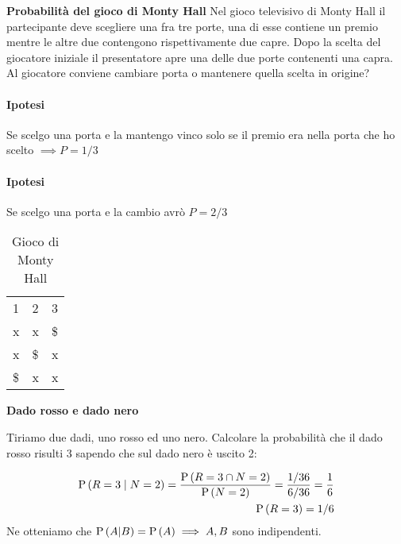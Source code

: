 \begin{exrc}
    \textbf{Probabilit\`a del gioco di Monty Hall}
    Nel gioco televisivo di Monty Hall il partecipante deve scegliere una fra tre porte, una di esse contiene un premio mentre le altre due contengono rispettivamente due capre. Dopo la scelta del giocatore iniziale il presentatore apre una delle due porte contenenti una capra. Al giocatore conviene cambiare porta o mantenere quella scelta in origine?
    
    \paragraph{Ipotesi} Se scelgo una porta e la mantengo vinco solo se il premio era nella porta che ho scelto $ \implies P = 1/3 $
    
    \paragraph{Ipotesi} Se scelgo una porta e la cambio avr\`o $ P = 2/3 $
    \begin{table}[H]
        \centering
        \caption{Gioco di Monty Hall}
        \begin{tabular}{lll}
            1  & 2  & 3  \\
            x  & x  & \$ \\
            x  & \$ & x  \\
            \$ & x  & x 
        \end{tabular}
    \end{table}
\end{exrc}
 
\begin{exrc}
    \textbf{Dado rosso e dado nero}
    
	Tiriamo due dadi, uno rosso ed uno nero. Calcolare la probabilit\`a che il dado rosso risulti 3 sapendo che sul dado nero \`e uscito 2:

    \begin{equation*}
        \begin{aligned}
            \text{P}\left(R=3 \mid N=2\right) = \dfrac{\text{P}\left(R=3 \cap N=2\right)}{\text{P}\left(N=2\right)} = 	\dfrac{1/36}{6/36} = \dfrac{1}{6} \\
            \text{P}\left(R=3\right) = 1/6
        \end{aligned}
    \end{equation*}
    Ne otteniamo che $ \text{P}\left(A|B\right) = \text{P}\left(A\right) \implies A, B $ sono indipendenti.
\end{exrc}

